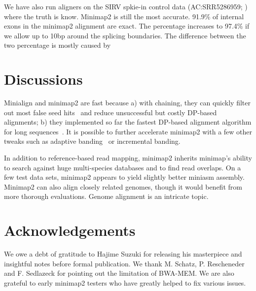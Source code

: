 \documentclass{bioinfo}
\begin{document}
We have also run aligners on the SIRV spkie-in control data (AC:SRR5286959;
\citealp{Byrne:2017aa}) where the truth is know. Minimap2 is still the most 
accurate. 91.9\% of internal exons in the minimap2 alignment are exact.
The percentage increases to 97.4\% if we allow up to 10bp around the splicing
boundaries. The difference between the two percentage is mostly caused by 

\section{Discussions}

Minialign and minimap2 are fast because a) with chaining, they can quickly
filter out most false seed hits~\citep{Li:2016aa} and reduce unsuccessful but
costly DP-based alignments; b) they implemented so far the fastest DP-based
alignment algorithm for long sequences~\citep{Suzuki:2016}. It is possible to
further accelerate minimap2 with a few other tweaks such as adaptive
banding~\citep{Suzuki130633} or incremental banding.

In addition to reference-based read mapping, minimap2 inherits minimap's
ability to search against huge multi-species databases and to find read
overlaps. On a few test data sets, minimap2 appears to yield slightly better
miniasm assembly. Minimap2 can also align closely related genomes, though it
would benefit from more thorough evaluations. Genome alignment is an intricate
topic.

\section*{Acknowledgements}
We owe a debt of gratitude to Hajime Suzuki for releasing his masterpiece and
insightful notes before formal publication. We thank M. Schatz, P. Rescheneder
and F.  Sedlazeck for pointing out the limitation of BWA-MEM. We are also
grateful to early minimap2 testers who have greatly helped to fix various
issues.


\end{document}
